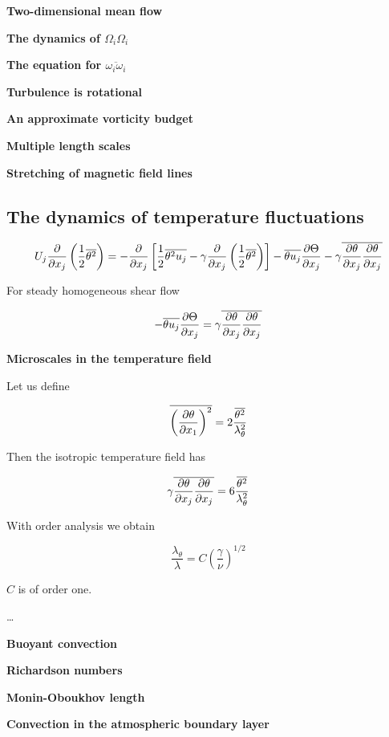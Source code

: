 \documentclass{article}
\begin{document}
\textbf{Two-dimensional mean flow}

\textbf{The dynamics of $\Omega_i\Omega_i$}

\textbf{The equation for $\overline{\omega_i\omega_i}$}

\textbf{Turbulence is rotational}

\textbf{An approximate vorticity budget}

\textbf{Multiple length scales}

\textbf{Stretching of magnetic field lines}

\subsection{The dynamics of temperature fluctuations}

\begin{equation*}
    U_j\frac{\p}{\p x_j}\left(\frac12\overline{\theta^2}\right)=-\frac{\p}{\p x_j}\left[\frac12\overline{\theta^2u_j}-\gamma\frac{\p}{\p x_j}\left(\frac12\overline{\theta^2}\right)\right]-\overline{\theta u_j}\frac{\partial \Theta}{\p x_j}-\gamma\overline{\frac{\p\theta}{\p x_j}\frac{\p\theta}{\p x_j}}
\end{equation*}

For steady homogeneous shear flow

\begin{equation*}
    -\overline{\theta u_j}\frac{\mathop{}\!\partial \Theta}{\mathop{}\!\partial x_j}=\gamma\overline{\frac{\mathop{}\!\partial \theta}{\mathop{}\!\partial x_j}\frac{\mathop{}\!\partial \theta}{\mathop{}\!\partial x_j}}
\end{equation*}

\textbf{Microscales in the temperature field}

Let us define

\begin{equation*}
    \overline{\left(\frac{\mathop{}\!\partial\theta}{\mathop{}\!\partial x_1}\right)^2}=2\frac{\overline{\theta^2}}{\lambda_\theta^2}
\end{equation*}

Then the isotropic temperature field has

\begin{equation*}
    \gamma\overline{\frac{\mathop{}\!\partial \theta}{\mathop{}\!\partial x_j}\frac{\mathop{}\!\partial \theta}{\mathop{}\!\partial x_j}}=6\frac{\overline{\theta^2}}{\lambda_\theta^2}
\end{equation*}

With order analysis we obtain

\begin{equation*}
    \frac{\lambda_\theta}{\lambda}=C\left(\frac{\gamma}{\nu}\right)^{1/2}
\end{equation*}

$C$ is of order one.

\dots

\textbf{Buoyant convection}

\textbf{Richardson numbers}

\textbf{Monin-Oboukhov length}

\textbf{Convection in the atmospheric boundary layer}



\ifx\allfiles\undefined         %
\end{document}
